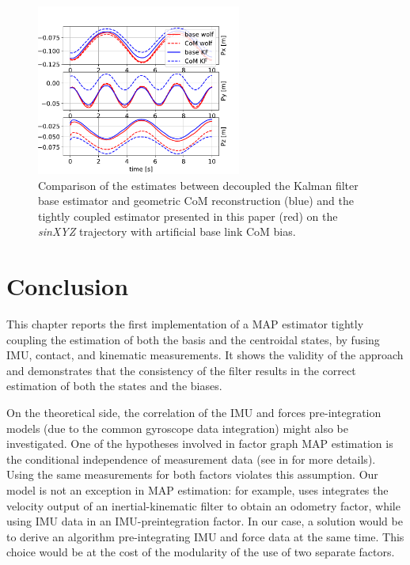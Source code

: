 \begin{figure}[t]
    \centering
    \includegraphics[width=0.6\textwidth]{figures/centroidal/base_com_position_wolf_vs_KF.pdf}
    \caption{Comparison of the estimates between decoupled the Kalman filter base estimator and geometric CoM reconstruction (blue) and 
    the tightly coupled estimator presented in this paper (red) on the \textit{sinXYZ} trajectory with artificial base link CoM bias.}
    \label{fig:comparison_KF_wolf}
\end{figure}




\section{Conclusion}

This chapter reports the first implementation of a MAP estimator tightly coupling the estimation of both the basis and 
the centroidal states, by fusing IMU, contact, and kinematic measurements. It shows the validity of the approach 
and demonstrates that the consistency of the filter results in the correct estimation of both the states and the biases.

On the theoretical side, the correlation of the IMU and forces pre-integration models (due to the common gyroscope data integration) might also be investigated. 
One of the hypotheses involved in factor graph MAP estimation is the conditional independence of measurement data (see  in  for more details).
Using the same measurements for both factors violates this assumption. Our model is not an exception in MAP estimation: for example, \cite{wisth2019robust} uses 
integrates the velocity output of an inertial-kinematic filter to obtain an odometry factor, while using IMU data in an IMU-preintegration factor. In our case,
a solution would be to derive an algorithm pre-integrating IMU and force data at the same time. This choice would be at the cost of the modularity of the 
use of two separate factors.  

